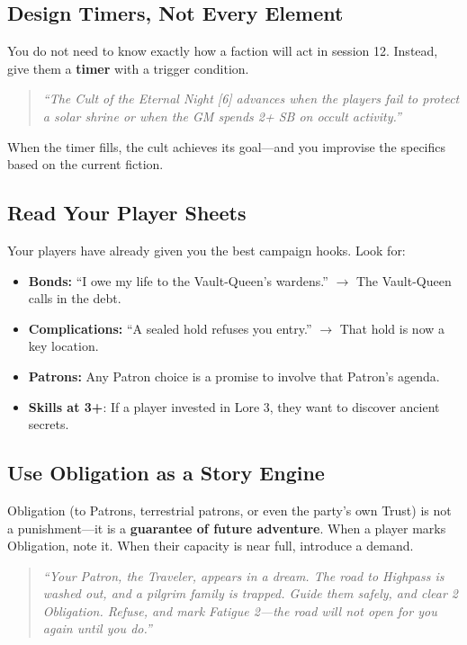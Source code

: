 \subsection{Design Timers, Not Every Element}

You do not need to know exactly how a faction will act in session 12. Instead, give them a \textbf{timer} with a trigger condition.

\begin{quote}
\emph{``The Cult of the Eternal Night [6] advances when the players fail to protect a solar shrine or when the GM spends 2+ SB on occult activity.''}
\end{quote}

When the timer fills, the cult achieves its goal---and you improvise the specifics based on the current fiction.

\subsection{Read Your Player Sheets}

Your players have already given you the best campaign hooks. Look for:
\begin{itemize}
  \item \textbf{Bonds:} ``I owe my life to the Vault-Queen's wardens.'' $\rightarrow$ The Vault-Queen calls in the debt.
  \item \textbf{Complications:} ``A sealed hold refuses you entry.'' $\rightarrow$ That hold is now a key location.
  \item \textbf{Patrons:} Any Patron choice is a promise to involve that Patron's agenda.
  \item \textbf{Skills at 3+}: If a player invested in Lore 3, they want to discover ancient secrets.
\end{itemize}

\subsection{Use Obligation as a Story Engine}

Obligation (to Patrons, terrestrial patrons, or even the party's own Trust) is not a punishment---it is a \textbf{guarantee of future adventure}. When a player marks Obligation, note it. When their capacity is near full, introduce a demand.

\begin{quote}
\emph{``Your Patron, the Traveler, appears in a dream. The road to Highpass is washed out, and a pilgrim family is trapped. Guide them safely, and clear 2 Obligation. Refuse, and mark Fatigue 2---the road will not open for you again until you do.''}
\end{quote}


